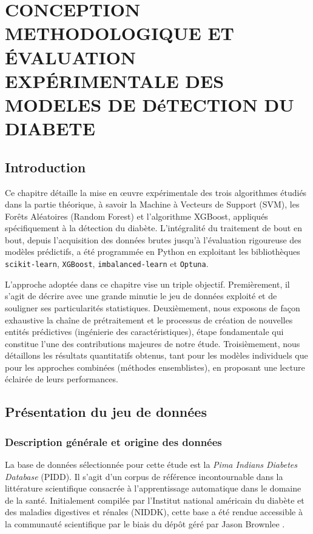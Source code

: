 \chapter{CONCEPTION METHODOLOGIQUE ET ÉVALUATION EXPÉRIMENTALE DES MODELES DE DéTECTION DU DIABETE}

\section{Introduction}

Ce chapitre détaille la mise en œuvre expérimentale des trois algorithmes étudiés dans la partie théorique, à savoir la Machine à Vecteurs de Support (SVM), les Forêts Aléatoires (Random Forest) et l'algorithme XGBoost, appliqués spécifiquement à la détection du diabète. L'intégralité du traitement de bout en bout, depuis l'acquisition des données brutes jusqu'à l'évaluation rigoureuse des modèles prédictifs, a été programmée en Python en exploitant les bibliothèques \texttt{scikit-learn}, \texttt{XGBoost}, \texttt{imbalanced-learn} et \texttt{Optuna}.

L'approche adoptée dans ce chapitre vise un triple objectif. Premièrement, il s'agit de décrire avec une grande minutie le jeu de données exploité et de souligner ses particularités statistiques. Deuxièmement, nous exposons de façon exhaustive la chaîne de prétraitement et le processus de création de nouvelles entités prédictives (ingénierie des caractéristiques), étape fondamentale qui constitue l'une des contributions majeures de notre étude. Troisièmement, nous détaillons les résultats quantitatifs obtenus, tant pour les modèles individuels que pour les approches combinées (méthodes ensemblistes), en proposant une lecture éclairée de leurs performances.

\section{Présentation du jeu de données}

\subsection{Description générale et origine des données}

La base de données sélectionnée pour cette étude est la \textit{Pima Indians Diabetes Database} (PIDD). Il s'agit d'un corpus de référence incontournable dans la littérature scientifique consacrée à l'apprentissage automatique dans le domaine de la santé. Initialement compilée par l'Institut national américain du diabète et des maladies digestives et rénales (NIDDK), cette base a été rendue accessible à la communauté scientifique par le biais du dépôt géré par Jason Brownlee \citep{sisodia2018}.

